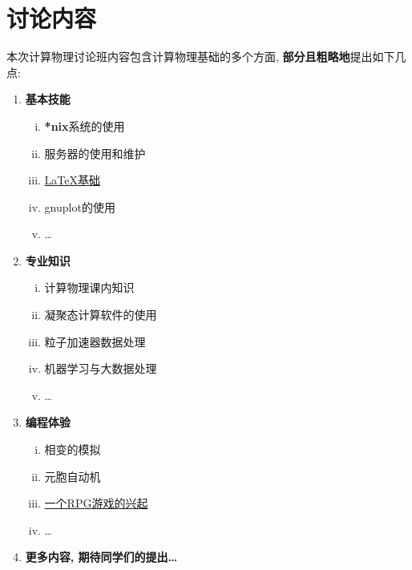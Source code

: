 \documentclass[10pt, a4paper, twocolumn]{article}
\begin{document}
  \section{讨论内容}
  本次计算物理讨论班内容包含计算物理基础的多个方面, \textbf{部分且粗略地}提出如下几点:
    \begin{enumerate}
      \item \textbf{基本技能}
      \begin{enumerate}[i)]
        \item \textbf{*nix}系统的使用
        \item 服务器的使用和维护
        \item \href{https://github.com/louisstuart96/lshort-new-zh-cn/%
                    blob/master/lshort-zh-cn.pdf}
                   {{\LaTeX}基础}
        \item gnuplot的使用
        \item \ldots
      \end{enumerate}  

      \item \textbf{专业知识}
      \begin{enumerate}[i)]
        \item 计算物理课内知识
        \item 凝聚态计算软件的使用
        \item 粒子加速器数据处理
        \item 机器学习与大数据处理
        \item \ldots
      \end{enumerate}

      \item \textbf{编程体验}
      \begin{enumerate}[i)]
        \item 相变的模拟
        \item 元胞自动机
        \item \href{https://github.com/JLUComPhy/JLU_Computational%
            _Physics/tree/master/Python/2nd_Lesson}{一个RPG游戏的兴起}
        \item \ldots
      \end{enumerate}

      \item \textbf{更多内容, 期待同学们的提出\ldots}
    \end{enumerate}
\end{document}
